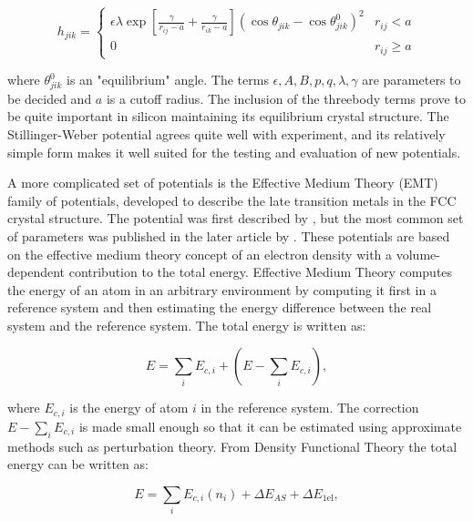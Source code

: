 \begin{equation}
    h_{jik} =
    \begin{cases}
        \displaystyle\epsilon \lambda \exp \left[ \frac{\gamma}{r_{ij} - a}
        + \frac{\gamma}{r_{ik} - a} \right]
        \left(\cos{\theta_{jik}} - \cos{\theta_{jik}^0} \right)^2 & r_{ij} < a \\[10pt]
        \displaystyle 0 & r_{ij} \geq a
    \end{cases}
\end{equation}

where $\theta_{jik}^0$ is an "equilibrium" angle.
The terms $\epsilon, A, B, p, q, \lambda, \gamma$ are parameters
to be decided and $a$ is a cutoff radius.
The inclusion of the threebody terms prove to be quite important
in silicon maintaining its equilibrium crystal structure.
The Stillinger-Weber potential agrees quite well with experiment,
and its relatively simple form makes it well suited for
the testing and evaluation of new potentials.
\par
A more complicated set of potentials is the Effective Medium Theory (EMT)
family of potentials, developed to describe the late transition
metals in the FCC crystal structure. The potential was first
described by \parencite[Jacobsen, K.W.; Nørskov, J.K. and
Puska, M.J.]{jacobsen1987interatomic}, but the most common set of parameters
was published in the later article by \parencite[Jacobsen, K.W.;
Stoltze, P. and Nørskov, J.K.]{jacobsen1996semi}.
These potentials are based on the effective medium theory concept
of an electron density with a volume-dependent contribution to
the total energy.
Effective Medium Theory computes the energy of an atom in an
arbitrary environment by computing it first in a reference system
and then estimating the energy difference between the real system
and the reference system.
The total energy is written as:

\begin{equation}
    E = \sum_i E_{c,i} + \left( E - \sum_i E_{c,i} \right) ,
\end{equation}

where $E_{c,i}$ is the energy of atom $i$ in the reference system.
The correction $E - \sum_i E_{c,i}$ is made small enough so that
it can be estimated using approximate methods such as perturbation theory.
From Density Functional Theory the total energy can be written as:

\begin{equation}
    E = \sum_i E_{c,i}(n_i) + \Delta E_{AS} + \Delta E_{\text{1el}} ,
\end{equation}

